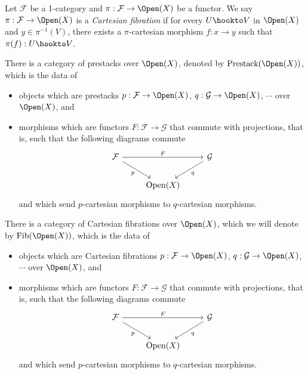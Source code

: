 \begin{definition}
    Let $\mathcal{F}$ be a 1-category and $\pi: \mathcal{F} \to \Open(X)$ be a functor. We say $\pi: \mathcal{F} \to \Open(X)$ is a \emph{Cartesian fibration} if for every $U \hookto V$ in $\Open(X)$ and $y \in \pi^{-1}(V)$, there exists a $\pi$-cartesian morphism $f: x \to y$ such that $\pi(f): U \hookto V$.
\end{definition}

\begin{definition}
    There is a category of prestacks over $\Open(X)$, denoted by $\text{Prestack}(\Open(X))$, which is the data of
    \begin{itemize}
        \item objects which are prestacks $p: \mathcal{F} \to \Open(X)$, $q: \mathcal{G} \to \Open(X)$, $\cdots$ over $\Open(X)$, and
        \item morphisms which are functors $F: \mathcal{F} \to \mathcal{G}$ that commute with projections, that is, such that the following diagrams commute
        \[\begin{tikzcd}
        	{\mathcal{F}} && {\mathcal{G}} \\
        	& {\text{Open}(X)}
        	\arrow["F", from=1-1, to=1-3]
        	\arrow["p"', from=1-1, to=2-2]
        	\arrow["q", from=1-3, to=2-2]
        \end{tikzcd}\]
        and which send $p$-cartesian morphisms to $q$-cartesian morphisms.
    \end{itemize}
\end{definition}

\begin{definition}
    There is a category of Cartesian fibrations over $\Open(X)$, which we will denote by $\text{Fib}(\Open(X))$, which is the data of 
    \begin{itemize}
        \item objects which are Cartesian fibrations $p: \mathcal{F} \to \Open(X)$, $q: \mathcal{G} \to \Open(X)$, $\cdots$ over $\Open(X)$, and
        \item morphisms which are functors $F: \mathcal{F} \to \mathcal{G}$ that commute with projections, that is, such that the following diagrams commute
        \[\begin{tikzcd}
        	{\mathcal{F}} && {\mathcal{G}} \\
        	& {\text{Open}(X)}
        	\arrow["F", from=1-1, to=1-3]
        	\arrow["p"', from=1-1, to=2-2]
        	\arrow["q", from=1-3, to=2-2]
        \end{tikzcd}\]
        and which send $p$-cartesian morphisms to $q$-cartesian morphisms.
    \end{itemize}
\end{definition}


